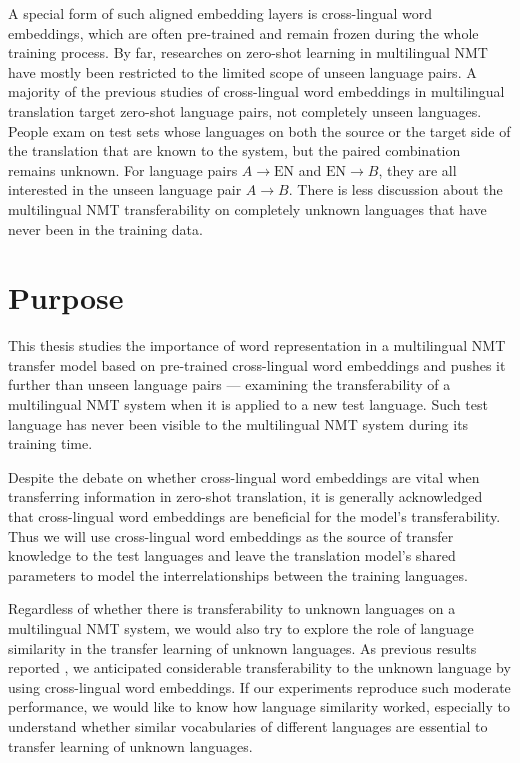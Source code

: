 \documentclass[thesis,fonts=libertine]{cluu}
\begin{document}
A special form of such aligned embedding layers is cross-lingual word embeddings, which are often pre-trained and remain frozen during the whole training process. By far, researches on zero-shot learning in multilingual NMT have mostly been restricted to the limited scope of unseen language pairs. A majority of the previous studies of cross-lingual word embeddings in multilingual translation target zero-shot language pairs, not completely unseen languages. People exam on test sets whose languages on both the source or the target side of the translation that are known to the system, but the paired combination remains unknown. For language pairs $A \rightarrow \text{EN}$ and $\text{EN} \rightarrow B$, they are all interested in the unseen language pair $A \rightarrow B$. There is less discussion about the multilingual NMT transferability on completely unknown languages that have never been in the training data.

\section{Purpose}

This thesis studies the importance of word representation in a multilingual NMT transfer model based on pre-trained cross-lingual word embeddings \parencite{Bojanowski:2016aa,Ammar:2016aa,Joulin:2018aa,Ruder:2019aa} and pushes it further than unseen language pairs --- examining the transferability of a multilingual NMT system when it is applied to a new test language. Such test language has never been visible to the multilingual NMT system during its training time.

Despite the debate on whether cross-lingual word embeddings are vital when transferring information in zero-shot translation, it is generally acknowledged that cross-lingual word embeddings are beneficial for the model's transferability. Thus we will use cross-lingual word embeddings as the source of transfer knowledge to the test languages and leave the translation model's shared parameters to model the interrelationships between the training languages.

Regardless of whether there is transferability to unknown languages on a multilingual NMT system, we would also try to explore the role of language similarity in the transfer learning of unknown languages. As previous results reported \parencite{Qi:2018aa}, we anticipated considerable transferability to the unknown language by using cross-lingual word embeddings. If our experiments reproduce such moderate performance, we would like to know how language similarity worked, especially to understand whether similar vocabularies of different languages are essential to transfer learning of unknown languages.
\end{document}
